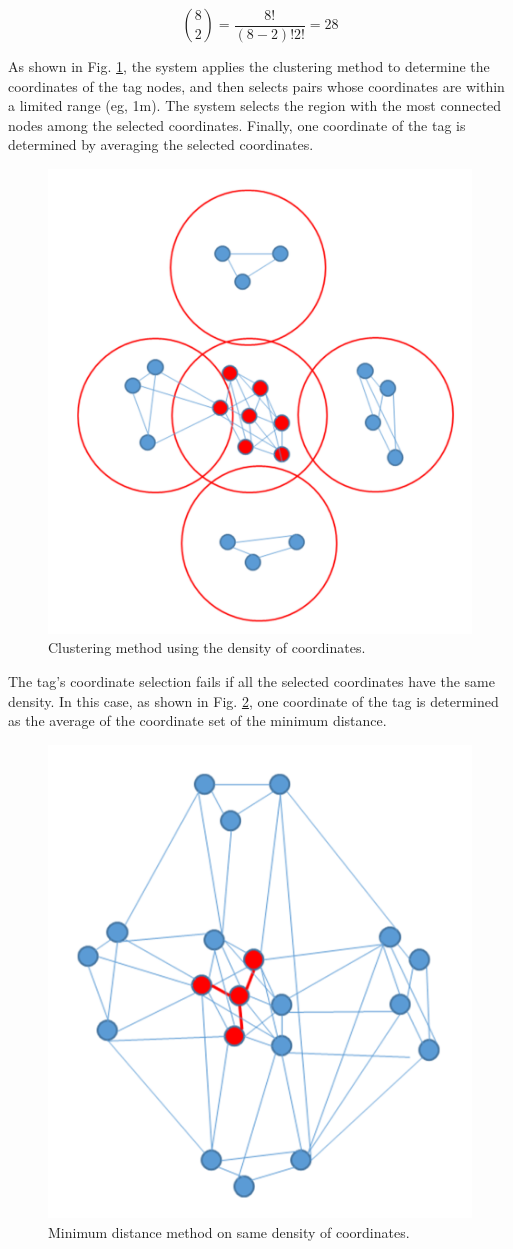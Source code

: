 \documentclass[conference]{IEEEtran}
\begin{document}
\begin{equation}
\binom{8}{2} = \frac{8!}{(8-2)!2!}=28\label{eq2}
\end{equation}

As shown in Fig. \ref{fig3}, the system applies the clustering method to determine the coordinates of the tag nodes, and then selects pairs whose coordinates are within a limited range (eg, 1m). The system selects the region with the most connected nodes among the selected coordinates. Finally, one coordinate of the tag is determined by averaging the selected coordinates.

\begin{figure}[htbp]
\centerline{\includegraphics[width=0.62\columnwidth]{fig3.png}}
\caption{Clustering method using the density of coordinates.}
\label{fig3}
\end{figure}

The tag's coordinate selection fails if all the selected coordinates have the same density. In this case, as shown in Fig. \ref{fig4}, one coordinate of the tag is determined as the average of the coordinate set of the minimum distance.

\begin{figure}[htbp]
\centerline{\includegraphics[width=0.62\columnwidth]{fig4.png}}
\caption{Minimum distance method on same density of coordinates.}
\label{fig4}
\end{figure}
\end{document}
